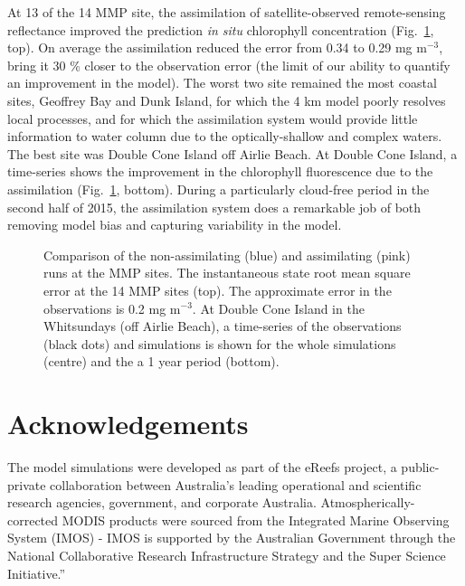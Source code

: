 \documentclass{elsart}
\begin{document}
At 13 of the 14 MMP site, the assimilation of satellite-observed remote-sensing reflectance improved the prediction \textit{in situ} chlorophyll concentration (Fig.~\ref{fig:RMSerror}, top). On average the assimilation reduced the error from 0.34 to 0.29 mg m$^{-3}$, bring it 30 \% closer to the observation error (the limit of our ability to quantify an improvement in the model). The worst two site remained the most coastal sites, Geoffrey Bay and Dunk Island, for which the 4 km model poorly resolves local processes, and for which the assimilation system would provide little information to water column due to the optically-shallow and complex waters. The best site was Double Cone Island off Airlie Beach. At Double Cone Island, a time-series shows the improvement in the chlorophyll fluorescence due to the assimilation (Fig.~\ref{fig:RMSerror}, bottom). During a particularly cloud-free period in the second half of 2015, the assimilation system does a remarkable job of both removing model bias and capturing variability in the model.

\begin{figure}[thb]
\begin{center}
\caption{Comparison of the non-assimilating (blue) and assimilating (pink) runs at the MMP sites. The instantaneous state root mean square error at the 14 MMP sites (top). The approximate error in the observations is 0.2 mg m$^{-3}$. At Double Cone Island in the Whitsundays (off Airlie Beach), a time-series of the observations (black dots) and simulations is shown for the whole simulations (centre) and the a 1 year period (bottom).}
\label{fig:RMSerror}
\end{center}
\end{figure}

\clearpage

\section{Acknowledgements} 

The model simulations were developed as part of the eReefs project, a public-private collaboration between Australia's leading operational and scientific research agencies, government, and corporate Australia. Atmospherically-corrected MODIS products were sourced from the Integrated Marine Observing System (IMOS) - IMOS is supported by the Australian Government through the National Collaborative Research Infrastructure Strategy and the Super Science Initiative.” 


 
\end{document}
